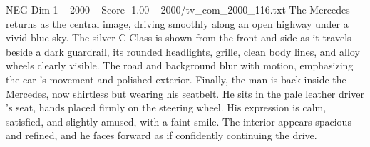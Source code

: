 \begin{textsample}{NEG Dim 1 – 2000 – Score -1.00 – 2000/tv\_com\_2000\_116.txt}
The Mercedes returns as the central image, driving smoothly along an open highway under a vivid blue sky.
The silver C-Class is shown from the front and side as it travels beside a dark guardrail, its rounded headlights, grille, clean body lines, and alloy wheels clearly visible.
The road and background blur with motion, emphasizing the car ’s movement and polished exterior.
Finally, the man is back inside the Mercedes, now shirtless but wearing his seatbelt.
He sits in the pale leather driver ’s seat, hands placed firmly on the steering wheel.
His expression is calm, satisfied, and slightly amused, with a faint smile.
The interior appears spacious and refined, and he faces forward as if confidently continuing the drive.

\end{textsample}
